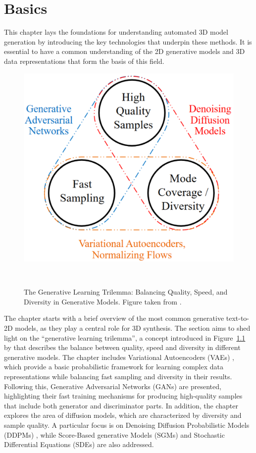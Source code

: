 \chapter{Basics}\label{ch:basics}

This chapter lays the foundations for understanding automated 3D model generation by introducing the key technologies that underpin these methods. It is essential to have a common understanding of the 2D generative models and 3D data representations that form the basis of this field.

\begin{figure}[ht]
  \centering
  \includegraphics[width=.4\columnwidth]{figures/BasicTrilemma.png}
  \caption{The Generative Learning Trilemma: Balancing Quality, Speed, and Diversity in Generative Models. Figure taken from \citep{xiao2022tackling}.}~\label{fig:generativeTrilemma}
\end{figure}

The chapter starts with a brief overview of the most common generative text-to-2D models, as they play a central role for 3D synthesis. The section aims to shed light on the ``generative learning trilemma'', a concept introduced in Figure~\ref{fig:generativeTrilemma} by \citeauthor{xiao2022tackling} that describes the balance between quality, speed and diversity in different generative models. The chapter includes Variational Autoencoders (VAEs) \citep{kingmaVAE,rezendeVAE}, which provide a basic probabilistic framework for learning complex data representations while balancing fast sampling and diversity in their results. Following this, Generative Adversarial Networks (GANs) \citep{goodfellowGAN} are presented, highlighting their fast training mechanisms for producing high-quality samples that include both generator and discriminator parts. In addition, the chapter explores the area of diffusion models, which are characterized by diversity and sample quality. A particular focus is on Denoising Diffusion Probabilistic Models (DDPMs) \citep{hoDDPMs,sohlDDPM}, while Score-Based generative Models (SGMs) \citep{song2019SGM} and Stochastic Differential Equations (SDEs) \citep{song2020score,song2021maximum} are also addressed. 

